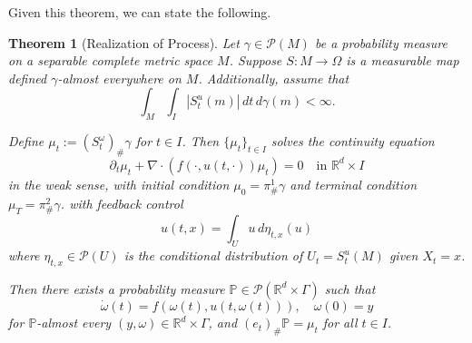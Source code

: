 \documentclass{article}
\newtheorem{theorem}{Theorem}[section]
\newcommand{\Rd}{\mathbb{R}^d}
\begin{document}

Given this theorem, we can state the following.

\begin{theorem}[Realization of Process]
\label{thm:realization}
Let $\gamma \in \mathcal{P}(M)$ be a probability measure on a separable complete metric space $M$. Suppose $S: M \rightarrow \Omega$ is a measurable map defined $\gamma$-almost everywhere on $M$. Additionally, assume that 
\begin{equation}
\int_{M} \int_I |S^u_t(m)| \, dt \, d\gamma(m) < \infty.
\end{equation}

Define $\mu_t := (S^{\omega}_t)_{\#}\gamma$ for $t \in I$. Then $\{\mu_t\}_{t \in I}$ solves the continuity equation  
\begin{equation}
\partial_t \mu_t + \nabla \cdot (f(\cdot, u(t,\cdot))\mu_t) = 0 \quad \text{in } \mathbb{R}^d \times I
\end{equation}
in the weak sense, with initial condition $\mu_0 = \pi^1_{\#}\gamma$ and terminal condition $\mu_T = \pi^2_{\#}\gamma$. with feedback control
\[u(t,x) = \int_{U} u \, d\eta_{t,x}(u)\]
where $\eta_{t,x} \in \mathcal{P}(U)$ is the conditional distribution of $U_t = S^u_t(M)$ given $X_t = x$.

Then there exists a probability measure $\mathbb{P} \in \mathcal{P}(\mathbb{R}^d \times \Gamma)$ such that 
\begin{equation}
\dot{\omega}(t) = f(\omega(t), u(t,\omega(t))), \quad \omega(0) = y
\end{equation}
for $\mathbb{P}$-almost every $(y,\omega) \in \mathbb{R}^d \times \Gamma$, and $(e_t)_{\#}\mathbb{P} = \mu_t$ for all $t \in I$.
\end{theorem}
\end{document}

